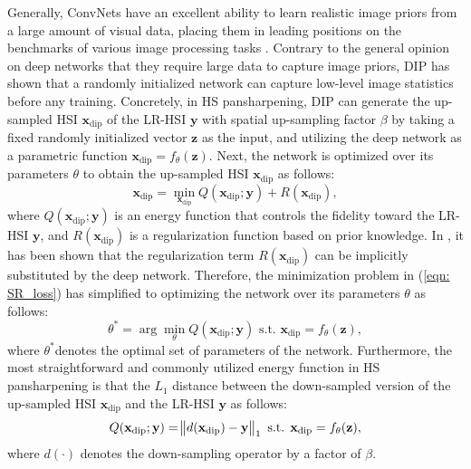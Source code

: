 \documentclass[journal]{IEEEtran}
\begin{document}
    \par Generally, ConvNets have an excellent ability to learn realistic image priors from a large amount of visual data, placing them in leading positions on the benchmarks of various image processing tasks \cite{image_denoising, super_resolution}. Contrary to the general opinion on deep networks that they require large data to capture image priors, DIP \cite{DeepImagePrior} has shown that a randomly initialized network can capture low-level image statistics before any training. Concretely, in HS pansharpening, DIP can generate the up-sampled HSI $\mathbf{x}_{\text{dip}}$ of the LR-HSI $\mathbf{y}$ with spatial up-sampling factor $\beta$ by taking a fixed randomly initialized vector $\mathbf{z}$ as the input, and utilizing the deep network as a parametric function $\mathbf{x}_{\text{dip}} = f_{\theta} (\mathbf{z})$. Next, the network is optimized over its parameters $\theta$ to obtain the up-sampled HSI $\mathbf{x}_{\text{dip}}$ as follows:
    \begin{equation}
        \mathbf{x}_{\text{dip}} = \min_{\mathbf{x}_{\text{dip}}} Q(\mathbf{x}_{\text{dip}}; \mathbf{y}) + R(\mathbf{x}_{\text{dip}}),
        \label{eqn: SR_loss}
    \end{equation}
    where $Q(\mathbf{x}_{\text{dip}};\mathbf{y})$ is an energy function that controls the fidelity toward the LR-HSI $\mathbf{y}$, and $R(\mathbf{x}_{\text{dip}})$ is a regularization function based on prior knowledge. In \cite{DeepImagePrior}, it has been shown that the regularization term $R(\mathbf{x}_{\text{dip}})$ can be implicitly substituted by the deep network. Therefore, the minimization problem in (\ref{eqn: SR_loss}) has simplified to optimizing the network over its parameters $\theta$ as follows:
    \begin{equation}
        \theta^{*} = \arg \min_{\theta} Q(\mathbf{x}_{\text{dip}}; \mathbf{y}) \text{ s.t. } \mathbf{x}_{\text{dip}} = f_{\theta} (\mathbf{z}),
        \label{eq: simplified_q}
    \end{equation}
    where $\theta^{*}$denotes the optimal set of parameters of the network. Furthermore, the most straightforward and commonly utilized energy function in HS pansharpening is that the $L_1$ distance \cite{Hyper-PNN} between the down-sampled version of the up-sampled HSI $\mathbf{x}_{\text{dip}}$ and the LR-HSI $\mathbf{y}$ as follows:
    \begin{equation}
        Q(\mathbf{x}_{\text{dip}}; \mathbf{y}) = \norm{d(\mathbf{x}_{\text{dip}})-\mathbf{y}}_1 \text{ s.t. } \mathbf{x}_{\text{dip}} = f_{\theta}(\mathbf{z}),
        \label{eq: standard_loss}
    \end{equation}
    where $d(\cdot)$ denotes the down-sampling operator by a factor of $\beta$. 
\end{document}
